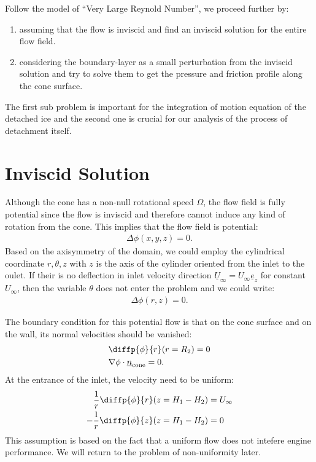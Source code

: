 \documentclass[12pt]{book}
\theoremstyle{bfnote}
\theoremstyle{bfnote}
\begin{document}
Follow the model of \enquote{Very Large Reynold Number}, we proceed further by:
\begin{enumerate}
    \item assuming that the flow is inviscid and find an inviscid solution for the entire flow field.
    \item considering the boundary-layer as a small perturbation from the inviscid solution and try to solve them to get the pressure and friction profile along the cone surface.
\end{enumerate}

The first sub problem is important for the integration of motion equation of the detached ice and the second one is crucial for our analysis of the process of detachment itself.

\section{Inviscid Solution} %
\label{sec:Inviscid_Solution}
Although the cone has a non-null rotational speed $\Omega$, the flow field is fully potential since the flow is inviscid and therefore cannot induce any kind of rotation from the cone. This implies that the flow field is potential:
\begin{align}
    \Delta \phi(x, y, z) = 0.
\end{align}
Based on the axisymmetry of the domain, we could employ the cylindrical coordinate $r, \theta, z$ with $z$ is the axis of the cylinder oriented from the inlet to the oulet. If their is no deflection in inlet velocity direction $\underline{U}_\infty = U_\infty \underline{e}_z$ for constant $U_\infty$, then the variable $\theta$ does not enter the problem and we could write:
\begin{align}
    \Delta \phi(r, z) = 0.
\end{align}

The boundary condition for this potential flow is that on the cone surface and on the wall, its normal velocities should be vanished:
\begin{align}
    & \diffp{\phi}{r}(r = R_2) = 0\\
    & {\nabla \phi} \cdot \underline{n}_{\text{cone}} = 0.
\end{align}
At the entrance of the inlet, the velocity need to be uniform:
\begin{align}
    \dfrac{1}{r} \diffp{\phi}{r}(z = H_1 - H_2) & = U_\infty \\
    - \dfrac{1}{r} \diffp{\phi}{z}(z = H_1 - H_2) & = 0
\end{align}
This assumption is based on the fact that a uniform flow does not intefere engine performance. We will return to the problem of non-uniformity later.
\end{document}
